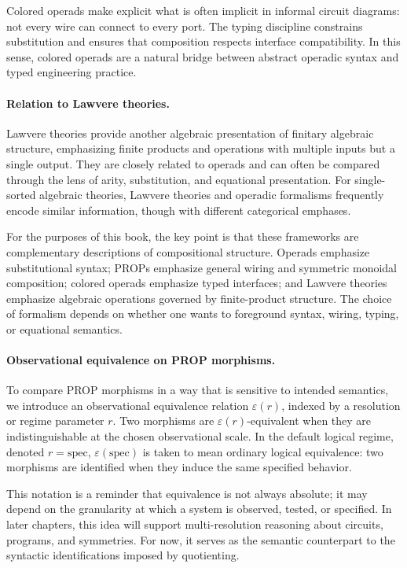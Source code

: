 \documentclass[11pt]{article}
\begin{document}
Colored operads make explicit what is often implicit in informal circuit diagrams: not every wire can connect to every port. The typing discipline constrains substitution and ensures that composition respects interface compatibility. In this sense, colored operads are a natural bridge between abstract operadic syntax and typed engineering practice.

\paragraph{Relation to Lawvere theories.}
Lawvere theories provide another algebraic presentation of finitary algebraic structure, emphasizing finite products and operations with multiple inputs but a single output. They are closely related to operads and can often be compared through the lens of arity, substitution, and equational presentation. For single-sorted algebraic theories, Lawvere theories and operadic formalisms frequently encode similar information, though with different categorical emphases.

For the purposes of this book, the key point is that these frameworks are complementary descriptions of compositional structure. Operads emphasize substitutional syntax; PROPs emphasize general wiring and symmetric monoidal composition; colored operads emphasize typed interfaces; and Lawvere theories emphasize algebraic operations governed by finite-product structure. The choice of formalism depends on whether one wants to foreground syntax, wiring, typing, or equational semantics.

\paragraph{Observational equivalence on PROP morphisms.}
To compare PROP morphisms in a way that is sensitive to intended semantics, we introduce an observational equivalence relation \(\varepsilon(r)\), indexed by a resolution or regime parameter \(r\). Two morphisms are \(\varepsilon(r)\)-equivalent when they are indistinguishable at the chosen observational scale. In the default logical regime, denoted \(r = \mathrm{spec}\), \(\varepsilon(\mathrm{spec})\) is taken to mean ordinary logical equivalence: two morphisms are identified when they induce the same specified behavior.

This notation is a reminder that equivalence is not always absolute; it may depend on the granularity at which a system is observed, tested, or specified. In later chapters, this idea will support multi-resolution reasoning about circuits, programs, and symmetries. For now, it serves as the semantic counterpart to the syntactic identifications imposed by quotienting.
\end{document}
